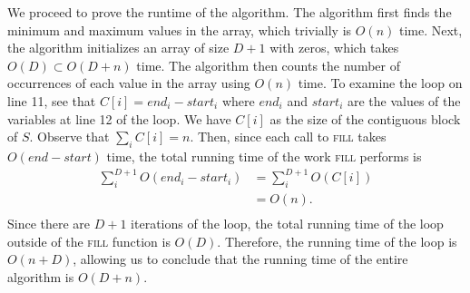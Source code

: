 {We proceed to prove the runtime of the algorithm. The algorithm
first finds the minimum and maximum values in the array, which trivially is
\(O(n)\) time. Next, the algorithm initializes an array of size \(D + 1\)
with zeros, which takes \(O(D) \subset O(D+n)\) time. The algorithm then counts
the number of occurrences of each value in the array using \(O(n)\) time.
To examine the loop on line 11, see that \(C[i] = end_i - start_i\)
where \(end_i\) and \(start_i\) are the values of the variables at line 12 of the loop.
We have \(C[i]\) as the size of the contiguous block of \(S\).
Observe that
\(\sum_{i}C[i] = n\). Then, since each call to \textsc{fill} takes \(O(end - start)\) time,
the total running time of the work \textsc{fill} performs is
\begin{align*}
	\sum_{i}^{D+1} O(end_i - start_i) & = \sum_{i}^{D+1} O(C[i]) \\
	                                  & = O(n).                  \\
\end{align*}
Since there are \(D + 1\) iterations of the loop, the total running time of the loop
outside of the \textsc{fill} function is \(O(D)\). Therefore, the running time of the loop is \(O(n + D)\),
allowing us to conclude that the running time of the entire algorithm is \(O(D+n)\).

}

